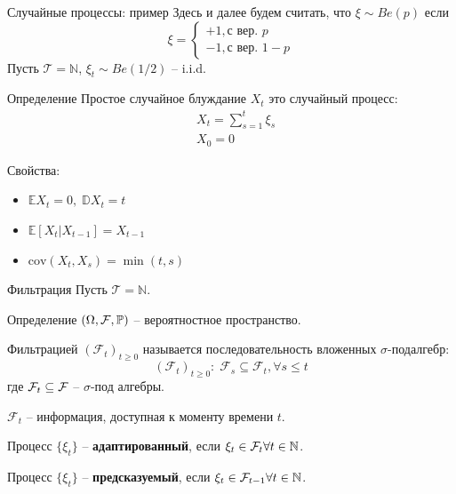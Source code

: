 \documentclass{beamer}
\begin{document}
\begin{frame}{Случайные процессы: пример}
Здесь и далее будем считать, что $\xi \sim Be(p)$ если
    $$
        \xi = \begin{cases}
            +1, \text{с вер. } p\\
            -1, \text{с вер. } 1-p
        \end{cases}
    $$
    Пусть $\mathcal{T}=\mathbb{N}$, $\xi_t \sim Be(1/2)$ -- i.i.d.
    \begin{block}{Определение}
        Простое случайное блуждание $X_t$ это случайный процесс:
        \begin{align*}
            & X_t = \sum_{s=1}^{t} \xi_s \\
            & X_0 = 0
        \end{align*}            
    \end{block}
     
    Свойства:
    \begin{itemize}
        \item $\mathbb{E} X_t = 0, \; \mathbb{D} X_t = t$
        \item $\mathbb{E} \left[ X_t | X_{t-1} \right] = X_{t-1}$
        \item $\mathrm{cov}(X_t, X_s) = \min(t, s)$
    \end{itemize}
\end{frame}
\begin{frame}{Фильтрация}
    Пусть $\mathcal{T} = \mathbb{N}$.
    \begin{block}{Определение}
        \((\Omega, \mathcal{F}, \mathbb{P})\) -- вероятностное пространство.
        
        Фильтрацией $(\mathcal{F}_t)_{t \geq 0}$ называется последовательность вложенных $\sigma$-подалгебр:
        $$
            (\mathcal{F}_t)_{t \geq 0}: \; \mathcal{F}_s \subseteq \mathcal{F}_t, \forall s\leq t
        $$
        где $\mathcal{F}_t \subseteq \mathcal{F}$ -- $\sigma$-под алгебры.   
    \end{block}

    $\mathcal{F}_t$ -- информация, доступная к моменту времени $t$.

    Процесс $\{\xi_t\}$ -- \textbf{адаптированный}, если $\xi_t \in \mathcal{F}_t \forall t \in \mathbb{N}$.

    Процесс $\{\xi_t\}$ -- \textbf{предсказуемый}, если $\xi_t \in \mathcal{F}_{t-1} \forall t \in \mathbb{N}$.
\end{frame}
\end{document}
